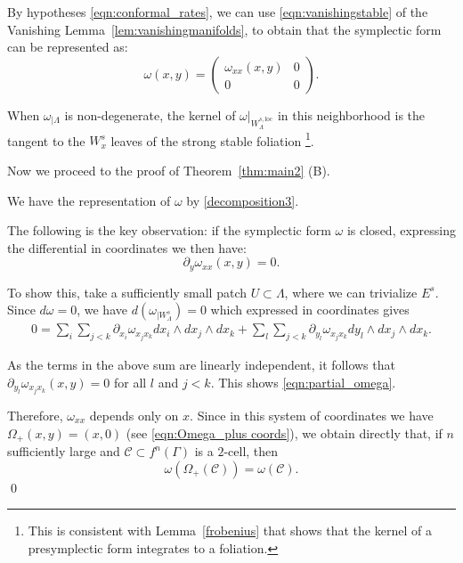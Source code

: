 \documentclass[11pt]{amsart}
\theoremstyle{definition}
\theoremstyle{remark}
\numberwithin{equation}{section}
\begin{document}
By hypotheses \eqref{eqn:conformal_rates},  we can  use \eqref{eqn:vanishingstable} of  the Vanishing Lemma~\ref{lem:vanishingmanifolds},
to
obtain that the symplectic form can be represented as:
\begin{equation}
  \label{decomposition3}
  \omega (x,y) = \begin{pmatrix}
    \omega_{xx}(x,y)  & 0 \\
    0 & 0
  \end{pmatrix} .
\end{equation}


When  $\omega_{\mid \Lambda}$ is non-degenerate, the kernel of $\omega|_{W^{s,\textrm{loc}}_\Lambda}$
in this neighborhood is the tangent to the  $W^s_x$ leaves of the strong stable
foliation
\footnote{
This is consistent with Lemma~\ref{frobenius} that shows
that the kernel of a presymplectic form integrates to a foliation.}.



Now we proceed to the  proof  of Theorem~\ref{thm:main2}  (B).


We have the representation of $\omega$ by \eqref{decomposition3}.

The following is the key  observation:
if the symplectic form $\omega$ is closed, expressing the
differential in coordinates we then have:
\begin{equation}\label{eqn:partial_omega}
\partial_{y} \omega_{xx}(x ,y)  = 0 .
\end{equation}

To show this, take a sufficiently small patch $U\subset \Lambda$,
where we can trivialize   $E^s$. Since $d\omega=0$, we have $d(\omega_{\mid W^s_\Lambda})=0$ which expressed in coordinates gives
\[\begin{split}
0=\sum_i\sum_{j<k} \partial_{x_i}\omega_{x_j x_k} dx_i\wedge dx_j\wedge dx_k+\sum_l\sum_{j<k} \partial_{ y_l }\omega_{x_j x_k} d y_l \wedge dx_j\wedge dx_k.
\end{split}
\]

As the terms in the above sum are linearly independent, it follows that $\partial_{ y_l }\omega_{x_j x_k}(x, y)  = 0$ for all $l$ and  $j< k$.
This shows \eqref{eqn:partial_omega}.


Therefore, $\omega_{xx}$ depends only on $x$.
Since in this system of coordinates we have $\Omega_+(x,y) = (x, 0)$ (see \eqref{eqn:Omega_plus coords}),
  we obtain directly that, if  $n$ sufficiently large and $\mathscr{C} \subset f^n(\Gamma)$ is a $2$-cell, then
  \[
  \omega( \Omega_+(\mathscr{C})) = \omega(\mathscr{C}) .
  \]
\qed
\end{document}

